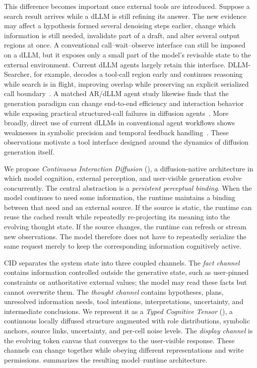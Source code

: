 This difference becomes important once external tools are introduced. Suppose a search result arrives while a dLLM is still refining its answer. The new evidence may affect a hypothesis formed several denoising steps earlier, change which information is still needed, invalidate part of a draft, and alter several output regions at once. A conventional call--wait--observe interface can still be imposed on a dLLM, but it exposes only a small part of the model's revisable state to the external environment. Current dLLM agents largely retain this interface. DLLM-Searcher, for example, decodes a tool-call region early and continues reasoning while search is in flight, improving overlap while preserving an explicit serialized call boundary~\citep{zhao2026dllmsearcher}. A matched AR/dLLM agent study likewise finds that the generation paradigm can change end-to-end efficiency and interaction behavior while exposing practical structured-call failures in diffusion agents~\citep{zhen2026dllmagent}. More broadly, direct use of current dLLMs in conventional agent workflows shows weaknesses in symbolic precision and temporal feedback handling~\citep{lu2026bitterlesson}. These observations motivate a tool interface designed around the dynamics of diffusion generation itself.

We propose \emph{Continuous Interaction Diffusion} (\cid), a diffusion-native architecture in which model cognition, external perception, and user-visible generation evolve concurrently. The central abstraction is a \emph{persistent perceptual binding}. When the model continues to need some information, the runtime maintains a binding between that need and an external source. If the source is static, the runtime can reuse the cached result while repeatedly re-projecting its meaning into the evolving thought state. If the source changes, the runtime can refresh or stream new observations. The model therefore does not have to repeatedly serialize the same request merely to keep the corresponding information cognitively active.

CID separates the system state into three coupled channels. The \emph{fact channel} contains information controlled outside the generative state, such as user-pinned constraints or authoritative external values; the model may read these facts but cannot overwrite them. The \emph{thought channel} contains hypotheses, plans, unresolved information needs, tool intentions, interpretations, uncertainty, and intermediate conclusions. We represent it as a \emph{Typed Cognitive Tensor} (\tct), a continuous locally diffused structure augmented with role distributions, symbolic anchors, source links, uncertainty, and per-cell noise levels. The \emph{display channel} is the evolving token canvas that converges to the user-visible response. These channels can change together while obeying different representations and write permissions.  summarizes the resulting model--runtime architecture.

